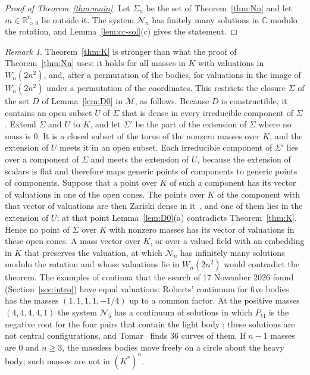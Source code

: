 \documentclass[11pt]{amsart}
\theoremstyle{definition}
\theoremstyle{remark}
\newtheorem{remark}[theorem]{Remark}
\numberwithin{equation}{section}
\newcommand{\CC}{\mathbb{C}}
\newcommand{\RR}{\mathbb{R}}
\newcommand{\cN}{\mathcal{N}}
\newcommand{\cM}{\mathcal{M}}
\begin{document}
\begin{proof}[Proof of Theorem~\ref{thm:main}]
Let $\Sigma_n$ be the set of Theorem~\ref{thm:Nn} and let $m \in \RR_{>0}^n$ lie outside it. The system
$\cN_n$ has finitely many solutions in $\CC$ modulo the rotation, and Lemma~\ref{lem:cc-sol}(c) gives the
statement.
\end{proof}

\begin{remark}\label{rem:roberts}
Theorem~\ref{thm:K} is stronger than what the proof of Theorem~\ref{thm:Nn} uses: it holds for all masses
in $K$ with valuations in $W_n(2n^2)$, and, after a permutation of the bodies, for valuations in the
image of $W_n(2n^2)$ under a permutation of the coordinates. This restricts the closure $\Sigma$ of the
set $D$ of Lemma~\ref{lem:D0} in $\cM$, as follows. Because $D$ is constructible, it contains an open
subset $U$ of $\Sigma$ that is dense in every irreducible component of $\Sigma$. Extend $\Sigma$ and
$U$ to $K$, and let $\Sigma'$ be the part of the extension of $\Sigma$ where no mass is $0$. It is a
closed subset of the torus of the nonzero masses over $K$, and the extension of $U$ meets it in an open
subset. Each irreducible component of $\Sigma'$ lies over a component of $\Sigma$ and meets the
extension of $U$, because the
extension of scalars is flat and therefore maps generic points of components to generic points of
components. Suppose that a
point over $K$ of such a component has its vector of valuations in one of the open cones. The points
over $K$ of the component with that vector of valuations are then Zariski dense in
it~\cite[Corollary~4.2, and Remark~2 of the erratum]{payne2009}, and one of them lies in the extension
of $U$; at that point Lemma~\ref{lem:D0}(a) contradicts Theorem~\ref{thm:K}. Hence no point of $\Sigma$
over $K$ with nonzero masses has its vector of valuations in these open cones. A mass vector over $K$, or
over a valued field with an embedding in $K$ that preserves the valuation, at which $\cN_n$ has infinitely
many solutions modulo the rotation and whose valuations lie in $W_n(2n^2)$ would contradict the theorem.
The examples of continua that the search of 17 November 2026 found (Section~\ref{sec:intro}) have
equal valuations: Roberts' continuum for five
bodies~\cite{roberts1999} has the masses $(1, 1, 1, 1, -1/4)$ up to a common factor. At the positive
masses $(4, 4, 4, 4, 1)$ the system $\cN_5$ has a continuum of solutions in which $P_{t4}$ is the
negative root for the four pairs that contain the light body
\cite[p.~543 and Remark~8]{albouykaloshin2012}; these solutions are not central configurations, and
Tomar~\cite{tomarspecial} finds 36 curves of them. If $n - 1$ masses are $0$ and $n \ge 3$, the
massless bodies move freely on a circle about the heavy body; such masses are not in $(K^{*})^n$.
\end{remark}
\end{document}
